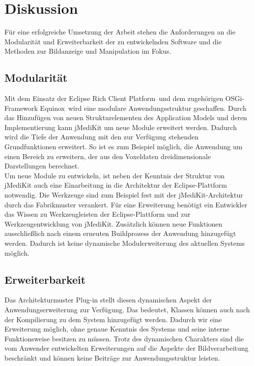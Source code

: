 \chapter{Diskussion}

Für eine erfolgreiche Umsetzung der Arbeit stehen die Anforderungen an die Modularität und Erweiterbarkeit der zu entwickelnden Software und die Methoden zur Bildanzeige und Manipulation im Fokus. 

\section*{Modularität}

Mit dem Einsatz der \glqq Eclipse Rich Client Platform\grqq\ und dem zugehörigen OSGi-Framework \glqq Equinox\grqq\ wird eine modulare Anwendungsstruktur geschaffen. Durch das Hinzufügen von neuen Strukturelementen des Application Models und deren Implementierung kann jMediKit um neue Module erweitert werden. Dadurch wird die Tiefe der Anwendung mit den zur Verfügung stehenden Grundfunktionen erweitert. So ist es zum Beispiel möglich, die Anwendung um einen Bereich zu erweitern, der aus den Voxeldaten dreidimensionale Darstellungen berechnet.\\
Um neue Module zu entwickeln, ist neben der Kenntnis der Struktur von jMediKit auch eine Einarbeitung in die Architektur der Eclipse-Plattform notwendig. Die Werkzeuge sind zum Beispiel fest mit der jMediKit-Architektur durch das Fabrikmuster verankert. Für eine Erweiterung benötigt ein Entwickler das Wissen zu Werkzeugleisten der Eclipse-Plattform und zur Werkzeugentwicklung von jMediKit. Zusätzlich können neue Funktionen ausschließlich nach einem erneuten Buildprozess der Anwendung hinzugefügt werden. Dadurch ist keine dynamische Modulerweiterung des aktuellen Systems möglich.

\section*{Erweiterbarkeit}
Das Architekturmuster Plug-in stellt diesen dynamischen Aspekt der Anwendungserweiterung zur Verfügung. Das bedeutet, Klassen können auch nach der Kompilierung zu dem System hinzugefügt werden. Dadurch wir eine Erweiterung möglich, ohne genaue Kenntnis des Systems und seine interne Funktionsweise besitzen zu müssen. Trotz des dynamischen Charakters sind die vom Anwender entwickelten Erweiterungen auf die Aspekte der Bildverarbeitung beschränkt und können keine Beiträge zur Anwendungsstruktur leisten.

